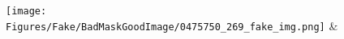 \documentclass[runningheads]{llncs}
\begin{document}
\begin{figure}[tb]
\texttt{[image: Figures/Fake/BadMaskGoodImage/0475750\_269\_fake\_img.png]} &%
\end{figure}
\end{document}
